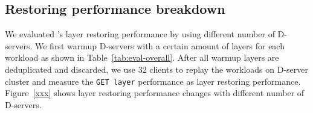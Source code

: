 \subsection{Restoring performance breakdown}

We evaluated \sysname's layer restoring performance by using different number of D-servers.
We first warmup D-servers with a certain amount of layers for each workload as shown in Table~\ref{tab:eval-overall}.
After all warmup layers are deduplicated and discarded,
we use 32 clients to replay the workloads on D-server cluster 
and measure the \texttt{GET layer} performance as layer restoring performance.
Figure~\ref{xxx} shows layer restoring performance changes with different number of D-servers.












